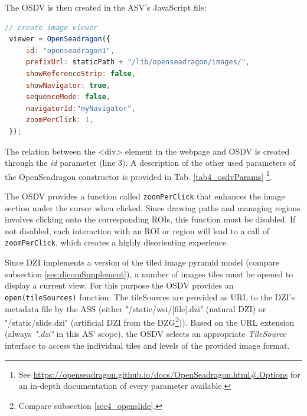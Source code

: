 The OSDV is then created in the ASV's JavaScript file:
\begin{lstlisting}[title=as{\textunderscore}viewer.js, frame=single, language=JavaScript]
 // create image viewer
 viewer = OpenSeadragon({
	 id: "openseadragon1",
	 prefixUrl: staticPath + "/lib/openseadragon/images/",
	 showReferenceStrip: false,
	 showNavigator: true,
	 sequenceMode: false,
	 navigatorId:"myNavigator",
	 zoomPerClick: 1,
 });
\end{lstlisting}

The relation between the \textless{div}{\textgreater} element in the webpage and OSDV is created through the \emph{id} parameter (line 3). A description of the other used parameters of the OpenSeadragon constructor is provided in Tab. \ref{tab4_osdvParams} \footnote{
	See \url{https://openseadragon.github.io/docs/OpenSeadragon.html\#.Options} for an in-depth documentation of every parameter available.
}.

The OSDV provides a function called \texttt{zoomPerClick} that enhances the image section under the cursor when clicked. Since drawing paths and managing regions involves clicking onto the corresponding ROIs, this function must be disabled. If not disabled, each interaction with an ROI or region will lead to a call of \texttt{zoomPerClick}, which creates a highly disorienting experience.

Since DZI implements a version of the tiled image pyramid model (compare subsection \ref{sec:dicomSupplement}), a number of images tiles must be opened to display a current view. For this purpose the OSDV provides an \texttt{open(tileSources)} function.  The tileSources are provided as URL to the DZI's metadata file by the ASS (either "/static/wsi/[file].dzi" (natural DZI) or "/static/slide.dzi" (artificial DZI from the DZG\footnote{
Compare subsection \ref{sec4_openslide}.
})). Based on the URL extension (always \emph{".dzi"} in this AS' scope), the OSDV selects an appropriate \emph{TileSource} interface to access the individual tiles and levels of the provided image format.

